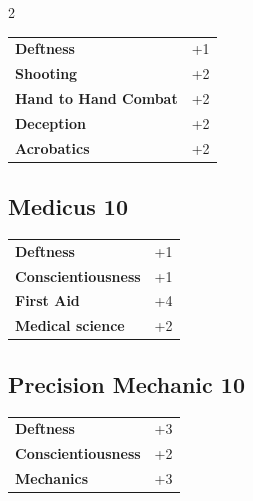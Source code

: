 \begin{multicols}{2}
\begin{tcolorbox}
\begin{tabular}{@{}ll@{}}
    \textbf{Deftness} & +1\\
    \textbf{Shooting} & +2\\
    \textbf{Hand to Hand Combat} & +2\\
    \textbf{Deception} & +2\\
    \textbf{Acrobatics} & +2\\
\end{tabular}


\end{tcolorbox}

\begin{tcolorbox}
    \subsection*{Medicus \hfill \small{10 }}
    \tcblower




\begin{tabular}{@{}ll@{}}
    \textbf{Deftness} & +1\\
    \textbf{Conscientiousness} & +1\\
    \textbf{First Aid} & +4\\
    \textbf{Medical science} & +2\\
\end{tabular}


\end{tcolorbox}

\begin{tcolorbox}
    \subsection*{Precision Mechanic \hfill \small{10 }}
    \tcblower




\begin{tabular}{@{}ll@{}}
    \textbf{Deftness} & +3\\
    \textbf{Conscientiousness} & +2\\
    \textbf{Mechanics} & +3\\
\end{tabular}


\end{tcolorbox}
\end{multicols}
